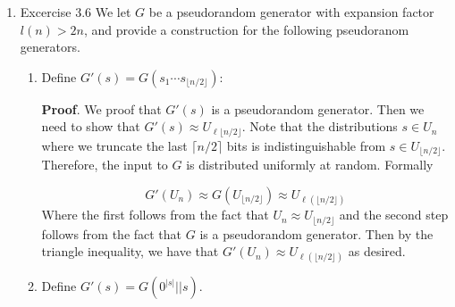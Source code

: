 \documentclass{article}
\begin{document}
\begin{enumerate}%

\item{}
Excercise 3.6
We let $G$ be a pseudorandom generator with expansion factor $l(n) > 2n$, and provide a construction 
for the following pseudoranom generators.%

\begin{enumerate}[noitemsep,topsep=\mdcompacttopsep,label=\alph*.]%

\item{}Define $G'(s) = G(s_1\cdots s_{\lfloor n /2 \rfloor})$:

\begin{mdbmarginx}{1ex}{0pt}{1ex}{0pt}%
\noindent{}\textbf{Proof}.  We proof that $G'(s)$ is a pseudorandom generator. Then we need to show that $G'(s) \approx U_{\ell{\lfloor n/2 \rfloor}}$.
Note that the distributions $s \in U_{n}$ where we truncate the last $\lceil n/2 \rceil $ bits is indistinguishable
from $s \in U_{\lfloor n/2 \rfloor }$. Therefore, the input to $G$ is distributed uniformly at random. Formally%
\end{mdbmarginx}%
\noindent\noindent\[%
G'(U_{n}) \approx G(U_{\lfloor n/2 \rfloor}) \approx U_{\ell(\lfloor n/2 \rfloor)} 
\]%
Where the first follows from the fact that $U_n \approx U_{\lfloor n / 2\rfloor}$ and the second
step follows from the fact that $G$ is a pseudorandom generator. Then by the triangle inequality,
we have that $G'(U_{n}) \approx U_{\ell(\lfloor n/2 \rfloor)}$ as desired.%

\item{}Define $G'(s) = G(0^{|s|}|| s)$.


\end{enumerate}
\end{enumerate}
\end{document}
